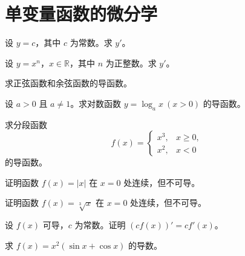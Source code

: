 \renewcommand{\thesection}{\arabic{section}}\renewcommand{\theHsection}{chapter.\arabic{section}}\setcounter{section}{2}\section{单变量函数的微分学}
\noindent\begin{minipage}{\textwidth}
设 $y=c$，其中 $c$ 为常数。求 $y'$。
\end{minipage}\par\vfill
\noindent\begin{minipage}{\textwidth}
设 $y=x^n$，$x\in\mathbb R$，其中 $n$ 为正整数。求 $y'$。
\end{minipage}\par\vfill
\noindent\begin{minipage}{\textwidth}
求正弦函数和余弦函数的导函数。
\end{minipage}\par\vfill
\noindent\begin{minipage}{\textwidth}
设 $a>0$ 且 $a\ne1$。求对数函数 $y=\log_a x\ (x>0)$ 的导函数。
\end{minipage}\par\vfill
\newpage
\noindent\begin{minipage}{\textwidth}
求分段函数\[f(x)=\begin{cases}x^3,&x\ge0,\\x^2,&x<0\end{cases}\]的导函数。
\end{minipage}\par\vfill
\noindent\begin{minipage}{\textwidth}
证明函数 $f(x)=|x|$ 在 $x=0$ 处连续，但不可导。
\end{minipage}\par\vfill
\noindent\begin{minipage}{\textwidth}
证明函数 $f(x)=\sqrt[3]x$ 在 $x=0$ 处连续，但不可导。
\end{minipage}\par\vfill
\noindent\begin{minipage}{\textwidth}
设 $f(x)$ 可导，$c$ 为常数。证明 $(cf(x))'=cf'(x)$。
\end{minipage}\par\vfill
\newpage
\noindent\begin{minipage}{\textwidth}
求 $f(x)=x^2(\sin x+\cos x)$ 的导数。
\end{minipage}\par\vfill
